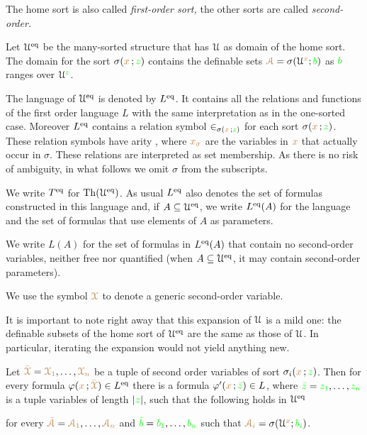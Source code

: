The home sort is also called \emph{first-order sort,}
the other sorts are called \emph{second-order.}

Let \emph{$\EuScript U^{{{\rm eq}}}$\/} be the many-sorted structure that has $\EuScript U$ as domain of the home sort.
The domain for the sort $\sigma({\color{brown} x}\,;{\color{green} z})$ contains 
the definable sets ${\color{brown}\EuScript A}=\sigma(\EuScript U^{\color{brown} x};{\color{green} b})$ as ${\color{green} b}$ ranges over $\EuScript U^{\color{green} z}$.

The language of $\EuScript U^{{\rm eq}}$ is denoted by $L^{{\rm eq}}$.
It contains all the relations and functions of the first order language $L$ with the same interpretation as in the one-sorted case.  
Moreover $L^{{\rm eq}}$ contains a relation symbol $\in_{\sigma({\color{brown} x}\,;{\color{green} z})}$ for each sort $\sigma({\color{brown} x}\,;{\color{green} z})$.
These relation symbols have arity , where ${\color{brown} x_\sigma}$ are the variables in ${\color{brown} x}$ that actually occur in $\sigma$.
These relations are interpreted as set membership.
As there is no risk of ambiguity, in what follows we omit $\sigma$ from the subscripts.

We write \emph{$T^{{{\rm eq}}}$\/} for ${\rm Th}(\EuScript U^{{\rm eq}})$.
As usual \emph{$L^{{\rm eq}}$\/} also denotes the set of formulas constructed in this language and, if $A\subseteq\EuScript U^{{\rm eq}}$, we write  \emph{$L^{{\rm eq}}(A)$\/} for the language and the set of formulas that use elements of $A$ as parameters.

\noindent\llap{\textcolor{red}{\Large\warning}\kern1.5ex}We write \emph{$L(A)$\/} for the set of formulas in $L^{{\rm eq}}(A)$ that contain no second-order variables, neither free nor quantified (when $A\subseteq\EuScript U^{{\rm eq}}$, it may contain second-order parameters).

We use the symbol ${\color{brown}\EuScript X}$ to denote a generic second-order variable.


It is important to note right away that this expansion of $\EuScript U$ is a mild one: the definable subsets of the home sort of $\EuScript U^{{\rm eq}}$ are the same as those of $\EuScript U$.
In particular, iterating the expansion would not yield anything new.

\begin{proposition}\label{prop_eqmild}
Let ${\color{brown}\bar{\EuScript X}}={\color{brown}\EuScript X_1},\dots,{\color{brown}\EuScript X_n}$ be a tuple of second order variables of sort $\sigma_i({\color{brown} x}\,;{\color{green} z})$.
Then for every formula $\varphi({\color{brown} x}\,;{\color{brown}\bar {\EuScript X}})\in L^{{\rm eq}}$ there is a formula $\varphi'({\color{brown} x}\,;{\color{green}\bar z})\in L$, where ${\color{green}\bar z}={\color{green} z_1},\dots,{\color{green} z_n}$ is a tuple variables of length $|{\color{green} z}|$, such that the following holds in $\EuScript U^{{\rm eq}}$


for every ${\color{brown}\bar{\EuScript A}}={\color{brown}\EuScript A_1},\dots,{\color{brown}\EuScript A_n}$ and ${\color{green}\bar b}={\color{green} b_1},\dots,{\color{green} b_n}$ such that ${\color{brown}\EuScript A_i}=\sigma(\EuScript U^{\color{brown} x};{\color{green} b_i})$.

\end{proposition}

